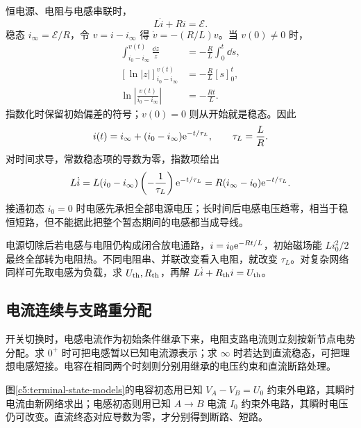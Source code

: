 恒电源、电阻与电感串联时，
\[
 L\dot i+Ri=\mathcal E.
\]
稳态 $i_\infty=\mathcal E/R$，令 $v=i-i_\infty$ 得 $\dot v=-(R/L)v$。当 $v(0)\ne0$ 时，
\[
\begin{aligned}
\int_{i_0-i_\infty}^{v(t)}\frac{\dd z}{z}
&=-\frac RL\int_0^t\dd s,\\
[\ln|z|]_{i_0-i_\infty}^{v(t)}&=-\frac RL[s]_0^t,\\
\ln\left|\frac{v(t)}{i_0-i_\infty}\right|&=-\frac{Rt}{L}.
\end{aligned}
\]
指数化时保留初始偏差的符号；$v(0)=0$ 则从开始就是稳态。因此
\[
 i(t)=i_\infty+(i_0-i_\infty)\mathrm e^{-t/\tau_L},\qquad
 \tau_L=\frac LR.
\]
对时间求导，常数稳态项的导数为零，指数项给出
\[
 L\dot i=L(i_0-i_\infty)\left(-\frac1{\tau_L}\right)\mathrm e^{-t/\tau_L}
 =R(i_\infty-i_0)\mathrm e^{-t/\tau_L}.
\]
接通初态 $i_0=0$ 时电感先承担全部电源电压；长时间后电感电压趋零，相当于稳恒短路，但不能据此把整个暂态期间的电感都当成导线。

电源切除后若电感与电阻仍构成闭合放电通路，$i=i_0\mathrm e^{-Rt/L}$，初始磁场能 $Li_0^2/2$ 最终全部转为电阻热。不同电阻串、并联改变看入电阻，就改变 $\tau_L$。对复杂网络同样可先取电感为负载，求 $U_{\rm th},R_{\rm th}$，再解 $L\dot i+R_{\rm th}i=U_{\rm th}$。

\subsection{电流连续与支路重分配}

开关切换时，电感电流作为初始条件继承下来，电阻支路电流则立刻按新节点电势分配。求 $0^+$ 时可把电感暂以已知电流源表示；求 $\infty$ 时若达到直流稳态，可把理想电感短接。电容在相同两个时刻则分别用继承的电压约束和直流断路处理。

图\ref{c5:terminal-state-models}的电容初态用已知 $V_A-V_B=U_0$ 约束外电路，其瞬时电流由新网络求出；电感初态则用已知 $A\to B$ 电流 $I_0$ 约束外电路，其瞬时电压仍可改变。直流终态对应导数为零，才分别得到断路、短路。

